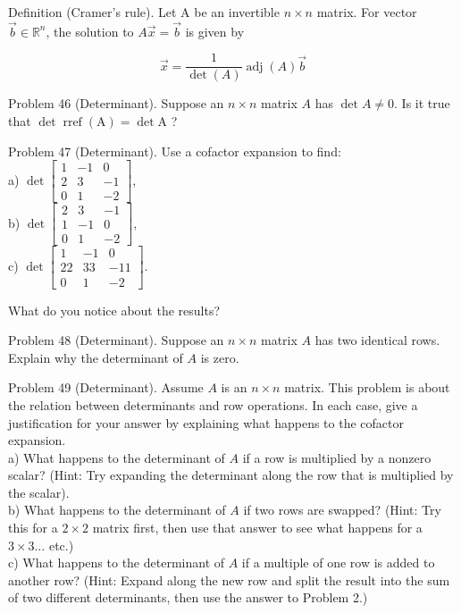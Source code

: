 \documentclass[10pt]{article}
\begin{document}
Definition (Cramer's rule). Let A be an invertible $n \times n$ matrix. For vector $\vec{b} \in \mathbb{R}^{n}$, the solution to $A \vec{x}=\vec{b}$ is given by

$$
\vec{x}=\frac{1}{\operatorname{det}(A)} \operatorname{adj}(A) \vec{b}
$$

Problem 46 (Determinant). Suppose an $n \times n$ matrix $A$ has $\operatorname{det} A \neq 0$. Is it true that $\operatorname{det} \operatorname{rref}(\mathrm{A})=\operatorname{det} \mathrm{A}$ ?

Problem 47 (Determinant). Use a cofactor expansion to find:\\
a) $\operatorname{det}\left[\begin{array}{ccc}1 & -1 & 0 \\ 2 & 3 & -1 \\ 0 & 1 & -2\end{array}\right]$,\\
b) $\operatorname{det}\left[\begin{array}{ccc}2 & 3 & -1 \\ 1 & -1 & 0 \\ 0 & 1 & -2\end{array}\right]$,\\
c) $\operatorname{det}\left[\begin{array}{ccc}1 & -1 & 0 \\ 22 & 33 & -11 \\ 0 & 1 & -2\end{array}\right]$.

What do you notice about the results?

Problem 48 (Determinant). Suppose an $n \times n$ matrix $A$ has two identical rows. Explain why the determinant of $A$ is zero.

Problem 49 (Determinant). Assume $A$ is an $n \times n$ matrix. This problem is about the relation between determinants and row operations. In each case, give a justification for your answer by explaining what happens to the cofactor expansion.\\
a) What happens to the determinant of $A$ if a row is multiplied by a nonzero scalar? (Hint: Try expanding the determinant along the row that is multiplied by the scalar).\\
b) What happens to the determinant of $A$ if two rows are swapped? (Hint: Try this for a $2 \times 2$ matrix first, then use that answer to see what happens for a $3 \times 3 \ldots$ etc.)\\
c) What happens to the determinant of $A$ if a multiple of one row is added to another row? (Hint: Expand along the new row and split the result into the sum of two different determinants, then use the answer to Problem 2.)
\end{document}
